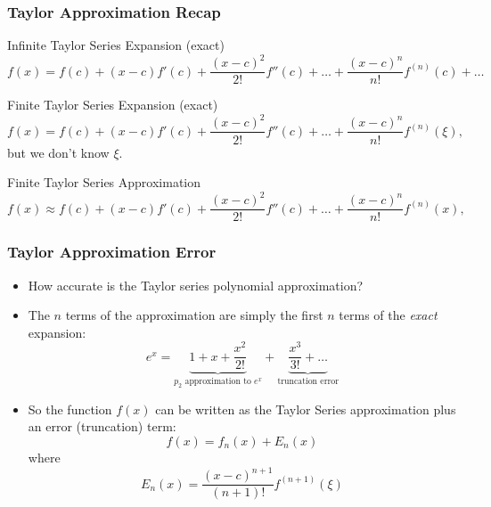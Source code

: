 \documentclass[10pt]{beamer}
\begin{document}
\begin{frame}
\frametitle{Taylor Approximation Recap}
\begin{block}{Infinite Taylor Series Expansion (exact)}
\begin{equation*}
    f(x) = f(c) + (x-c) f'(c) + \frac{(x-c)^2}{2!} f''(c) + \dots +
\frac{(x-c)^n}{n!} f^{(n)}(c)+\dots
\end{equation*}
\end{block}
\begin{block}{Finite Taylor Series Expansion (exact)}
\begin{equation*}
    f(x) = f(c) + (x-c) f'(c) + \frac{(x-c)^2}{2!} f''(c) + \dots +
\frac{(x-c)^n}{n!} f^{(n)}(\xi),
\end{equation*}
but we don't know $\xi$.
\end{block}
\begin{block}{Finite Taylor Series Approximation}
\begin{equation*}
    f(x) \approx f(c) + (x-c) f'(c) + \frac{(x-c)^2}{2!} f''(c) + \dots +
\frac{(x-c)^n}{n!} f^{(n)}(x),
\end{equation*}
\end{block}
\end{frame}
\begin{frame}
\frametitle{Taylor Approximation Error}
\begin{itemize}
  \item How accurate is the Taylor series polynomial approximation?
  \item The $n$ terms of the approximation are simply the first $n$
terms of the \emph{exact} expansion:
  \begin{equation}
    e^x = \underbrace{1 + x + \frac{x^2}{2!}}_{\text{$p_2$ approximation
to $e^x$}} + \underbrace{\frac{x^3}{3!} + \dots}_{\text{truncation
error}}
\end{equation}
\item 
So the function $f(x)$ can be written as the Taylor Series approximation
plus an error (truncation) term:
\begin{equation*}
  f(x)  = f_n(x) + E_n(x)
\end{equation*}
where
\begin{equation*}
  E_n(x) = \frac{(x-c)^{n+1}}{(n+1)!}f^{(n+1)}(\xi)
\end{equation*}
\end{itemize}
\end{frame}
\end{document}
